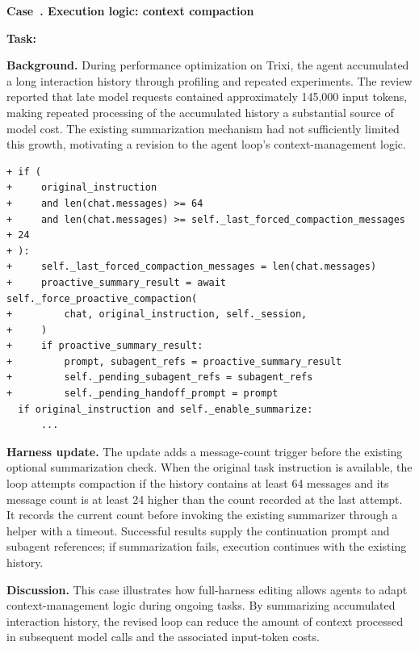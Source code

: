 \par\medskip
{}
\label{case:context}
\noindent\textbf{Case~\theharnesscase. Execution logic: context compaction}
\par\nopagebreak

\noindent\textbf{Task:} {\small{}}

\textbf{Background.}
During performance optimization on Trixi, the agent accumulated a long interaction history through profiling and repeated experiments. The review reported that late model requests contained approximately 145,000 input tokens, making repeated processing of the accumulated history a substantial source of model cost. The existing summarization mechanism had not sufficiently limited this growth, motivating a revision to the agent loop's context-management logic.

\begin{lstlisting}[linebackgroundcolor={\DiffBackground{1,2,3,4,5,6,7,8,9,10,11,12,13}{}}]
+ if (
+     original_instruction
+     and len(chat.messages) >= 64
+     and len(chat.messages) >= self._last_forced_compaction_messages + 24
+ ):
+     self._last_forced_compaction_messages = len(chat.messages)
+     proactive_summary_result = await self._force_proactive_compaction(
+         chat, original_instruction, self._session,
+     )
+     if proactive_summary_result:
+         prompt, subagent_refs = proactive_summary_result
+         self._pending_subagent_refs = subagent_refs
+         self._pending_handoff_prompt = prompt
  if original_instruction and self._enable_summarize:
      ...
\end{lstlisting}

\textbf{Harness update.}
The update adds a message-count trigger before the existing optional summarization check. When the original task instruction is available, the loop attempts compaction if the history contains at least 64 messages and its message count is at least 24 higher than the count recorded at the last attempt. It records the current count before invoking the existing summarizer through a helper with a timeout. Successful results supply the continuation prompt and subagent references; if summarization fails, execution continues with the existing history.

\textbf{Discussion.}
This case illustrates how full-harness editing allows agents to adapt context-management logic during ongoing tasks. By summarizing accumulated interaction history, the revised loop can reduce the amount of context processed in subsequent model calls and the associated input-token costs.


